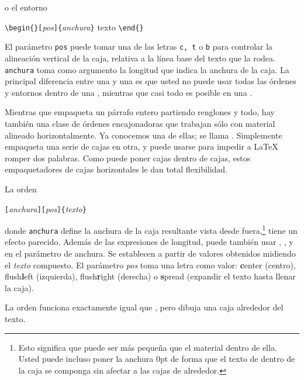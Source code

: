 o el entorno

\begin{lscommand}
\verb|\begin{|\verb|}[|\emph{pos}\verb|]{|\emph{anchura}\verb|}| texto 
\verb|\end{|\verb|}|
\end{lscommand}

El parámetro \texttt{pos} puede tomar una de las letras \texttt{c, t} o \texttt{b} para controlar la alineación vertical de la caja, relativa a la línea base del texto que la rodea. \texttt{anchura} toma como argumento la longitud que indica la anchura de la caja.  La principal diferencia entre una  y una  es que usted no puede usar todas las órdenes y entornos dentro de una , mientras que casi todo es posible en una .

Mientras que  empaqueta un párrafo entero partiendo renglones y todo, hay también una clase de órdenes encajonadoras que trabajan sólo con material alineado horizontalmente.  Ya conocemos una de ellas; se llama .  Simplemente empaqueta una serie de cajas en otra, y puede usarse para impedir a \LaTeX{} romper dos palabras.  Como puede  poner cajas dentro de cajas, estos empaquetadores de cajas horizontales le dan total flexibilidad.

La orden
\begin{lscommand}
\verb|[|\emph{anchura}\verb|][|\emph{pos}\verb|]{|\emph{texto}\verb|}|
\end{lscommand}

donde \texttt{anchura} define la anchura de la caja resultante vista desde fuera,\footnote{Esto significa que puede ser más pequeña que el material dentro de ella.  Usted puede incluso poner la anchura 0pt de forma que el texto de dentro de la caja se componga sin afectar a las cajas de alrededor.}  tiene un efecto parecido. Además de las expresiones de longitud, puede también usar , ,  y  en el parámetro de anchura.  Se establecen a partir de valores obtenidos midiendo el \emph{texto} compuesto.  El parámetro \emph{pos} toma una letra como valor: \textbf{c}enter (centro), flush\textbf{l}eft (izquierda), flush\textbf{r}ight (derecha) o \textbf{s}pread (expandir el texto hasta llenar la caja).

La orden  funciona exactamente igual que , pero dibuja una caja alrededor del texto.

